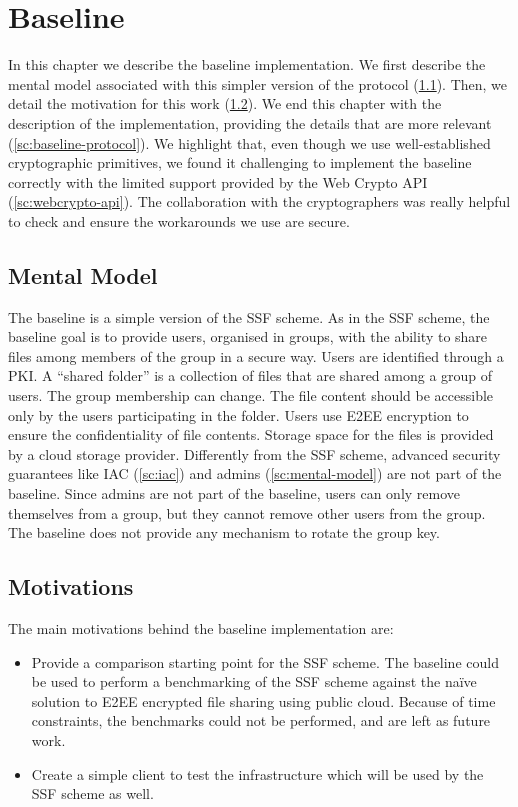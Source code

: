 \chapter{Baseline}\label{ch:baseline}

In this chapter we describe the baseline implementation.
We first describe the mental model
associated with this simpler version
of the protocol (\cref{sc:baseline-mental-model}).
Then, we detail the motivation for this work (\cref{sc:baseline-motivations}).
We end this chapter with the description of the
implementation, providing the details
that are more relevant (\cref{sc:baseline-protocol}).
We highlight that, even though we use well-established
cryptographic primitives, we found it
challenging to implement the baseline correctly
with the limited support provided by the
Web Crypto API (\cref{sc:webcrypto-api}).
The collaboration with the cryptographers
was really helpful to check and ensure the
workarounds we use are secure.

\section{Mental Model}\label{sc:baseline-mental-model}
The baseline is a simple version of the SSF scheme.
As in the SSF scheme, the baseline 
goal is to provide users, organised in groups, with
the ability to share files among members of the group in
a secure way.
Users are identified through a PKI.
A ``shared folder'' is a collection of files that are shared 
among a group of users. 
The group membership can change.
The file content 
should be accessible only by the users participating 
in the folder. Users use E2EE encryption to ensure the confidentiality
of file contents.
Storage space for the files is
provided by a cloud storage provider. 
Differently from the SSF scheme, advanced security guarantees
like IAC (\cref{sc:iac}) and admins (\cref{sc:mental-model}) are not part of the baseline.
Since admins are not part of the baseline, users can only remove themselves from a group, but they cannot remove other users from the group.
The baseline does not provide any mechanism to rotate the group key.

\section{Motivations}\label{sc:baseline-motivations}

The main motivations behind the baseline implementation are:
\begin{itemize}
    \item Provide a comparison starting point for the SSF scheme. The baseline could be used to perform a benchmarking of the SSF scheme against the na\"ive solution to E2EE encrypted file sharing using public cloud. Because of time constraints, the benchmarks could not be performed, and are left as future work.
    \item Create a simple client to test the infrastructure which will be used by the SSF scheme as well. 
\end{itemize}

